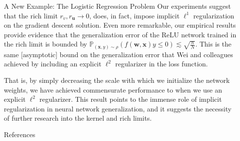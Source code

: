 \documentclass[final, 20pt]{beamer}
\newlength{\sepwidth}
\newlength{\colwidth}
\newcommand{\separatorcolumn}{\begin{column}{\sepwidth}\end{column}}
\begin{document}
\begin{frame}[t]
\begin{columns}[t]
\begin{column}{\colwidth}
\begin{block}{A New Example: The Logistic Regression Problem}
    Our experiments suggest that the rich limit $r_v, r_{\boldsymbol{u}} \rightarrow 0$, does, in fact, impose implicit $\ell^1$ regularization on the gradient descent solution. Even more remarkable, our empirical results provide evidence that the generalization error of the ReLU network trained in the rich limit is bounded by $\mathbb{P}_{(\boldsymbol{x}, y) \sim \rho}(f(\boldsymbol{w}, \boldsymbol{x})y \leq 0) \lesssim \sqrt{\frac{n}{N}}$. This is the same [asymptotic] bound on the generalization error that Wei and colleagues achieved by including an explicit $\ell^2$ regularizer in the loss function.
    
    That is, by simply decreasing the scale with which we initialize the network weights, we have achieved commensurate performance to when we use an explicit $\ell^2$ regularizer. This result points to the immense role of implicit regularization in neural network generalization, and it suggests the necessity of further research into the kernel and rich limits.
    \end{block}
  \begin{block}{References}
    \footnotesize{}
  \end{block}

\end{column}

\separatorcolumn
\end{columns}

\end{frame}
\end{document}
